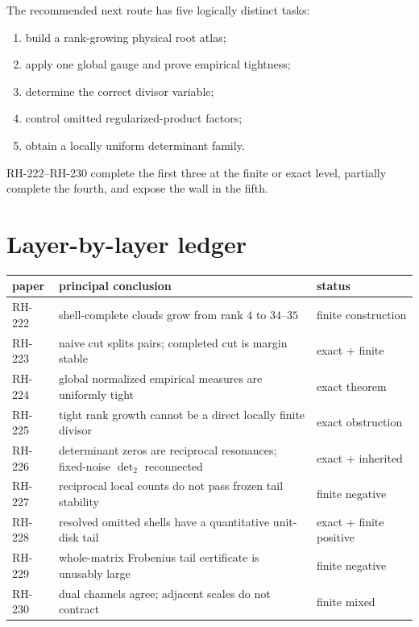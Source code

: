 \documentclass[11pt]{article}
\theoremstyle{remark}\newtheorem{remark}[theorem]{Remark}
\begin{document}
The recommended next route has five logically distinct tasks:
\begin{enumerate}[leftmargin=2em]
\item build a rank-growing physical root atlas;
\item apply one global gauge and prove empirical tightness;
\item determine the correct divisor variable;
\item control omitted regularized-product factors;
\item obtain a locally uniform determinant family.
\end{enumerate}

RH-222--RH-230 complete the first three at the finite or exact level, partially
complete the fourth, and expose the wall in the fifth.

\section{Layer-by-layer ledger}

\begin{center}
\small
\begin{tabular}{p{}p{}p{}}
\toprule
paper & principal conclusion & status\\
\midrule
RH-222 & shell-complete clouds grow from rank $4$ to $34$--$35$ & finite construction\\
RH-223 & naive cut splits pairs; completed cut is margin stable & exact + finite\\
RH-224 & global normalized empirical measures are uniformly tight & exact theorem\\
RH-225 & tight rank growth cannot be a direct locally finite divisor & exact obstruction\\
RH-226 & determinant zeros are reciprocal resonances; fixed-noise $\det_2$ reconnected & exact + inherited\\
RH-227 & reciprocal local counts do not pass frozen tail stability & finite negative\\
RH-228 & resolved omitted shells have a quantitative unit-disk tail & exact + finite positive\\
RH-229 & whole-matrix Frobenius tail certificate is unusably large & finite negative\\
RH-230 & dual channels agree; adjacent scales do not contract & finite mixed\\
\bottomrule
\end{tabular}
\end{center}
\end{document}
